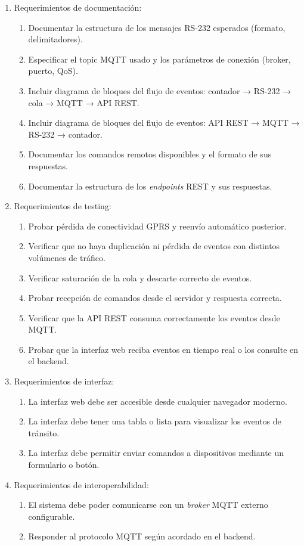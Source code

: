 \documentclass[
11pt, %
]{charter}
\begin{document}
\begin{enumerate}
	\item Requerimientos de documentación:
		\begin{enumerate}
			\item Documentar la estructura de los mensajes RS-232 esperados (formato, delimitadores).
			\item Especificar el topic MQTT usado y los parámetros de conexión (broker, puerto, QoS).
			\item Incluir diagrama de bloques del flujo de eventos: contador → RS-232 → cola → MQTT → API REST.
			\item Incluir diagrama de bloques del flujo de eventos: API REST → MQTT → RS-232 → contador.
			\item  Documentar los comandos remotos disponibles y el formato de sus respuestas.
			\item Documentar la estructura de los \textit{endpoints} REST y sus respuestas.
		\end{enumerate}

	\item Requerimientos de testing:
		\begin{enumerate}
			\item Probar pérdida de conectividad GPRS y reenvío automático posterior.
			\item Verificar que no haya duplicación ni pérdida de eventos con distintos volúmenes de tráfico.
			\item  Verificar saturación de la cola y descarte correcto de eventos.
			\item  Probar recepción de comandos desde el servidor y respuesta correcta.
			\item  Verificar que la API REST consuma correctamente los eventos desde MQTT.
			\item  Probar que la interfaz web reciba eventos en tiempo real o los consulte en el backend.
		\end{enumerate}
	\item Requerimientos de interfaz:
		\begin{enumerate}
			\item La interfaz web debe ser accesible desde cualquier navegador moderno.
			\item La interfaz debe tener una tabla o lista para visualizar los eventos de tránsito.
			\item La interfaz debe permitir enviar comandos a dispositivos mediante un formulario o botón.
		\end{enumerate}

	
	\item Requerimientos de interoperabilidad:
		\begin{enumerate}
			\item  El sistema debe poder comunicarse con un \textit{broker} MQTT externo configurable.
			\item Responder al protocolo MQTT según acordado en el backend.
		\end{enumerate}


\end{enumerate}
\end{document}
